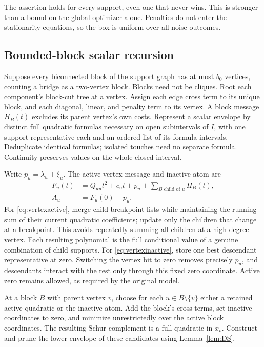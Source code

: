 The assertion holds for every support, even one that never wins. This is
stronger than a bound on the global optimizer alone. Penalties do not enter
the stationarity equations, so the box is uniform over all noise outcomes.

\subsection{Bounded-block scalar recursion}
Suppose every biconnected block of the support graph has at most $b_0$
vertices, counting a bridge as a two-vertex block. Blocks need not be cliques.
Root each component's block-cut tree at a vertex. Assign each edge cross
term to its unique block, and each diagonal, linear, and penalty term to
its vertex. A block message $H_B(t)$ excludes its parent vertex's own costs.
Represent a scalar envelope by distinct full quadratic formulas necessary
on open subintervals of $I$, with one support representative each and an
ordered list of its formula intervals. Deduplicate identical formulas;
isolated touches need no separate formula. Continuity preserves values on
the whole closed interval.

Write $p_u=\lambda_u+\xi_u$. The active vertex message and inactive atom are
\begin{align}
 F_u(t)&=Q_{uu}t^2+c_ut+p_u+\sum_{B\text{ child of }u}H_B(t),
                                                        \label{eq:vertexactive}\\
 A_u&=F_u(0)-p_u.\label{eq:vertexinactive}
\end{align}
For \eqref{eq:vertexactive}, merge child breakpoint lists while maintaining
the running sum of their current quadratic coefficients; update only the
children that change at a breakpoint. This avoids repeatedly summing all
children at a high-degree vertex. Each resulting polynomial is the full
conditional value of a genuine combination of child supports. For
\eqref{eq:vertexinactive}, store one best descendant representative at zero.
Switching the vertex bit to zero removes precisely $p_u$, and descendants
interact with the rest only through this fixed zero coordinate. Active zero
remains allowed, as required by the original model.

At a block $B$ with parent vertex $v$, choose for each
$u\in B\setminus\{v\}$ either a retained active quadratic or the inactive
atom. Add the block's cross terms, set inactive coordinates to zero, and
minimize unrestrictedly over the active block coordinates. The resulting
Schur complement is a full quadratic in $x_v$. Construct and prune the lower
envelope of these candidates using Lemma~\ref{lem:DS}.

